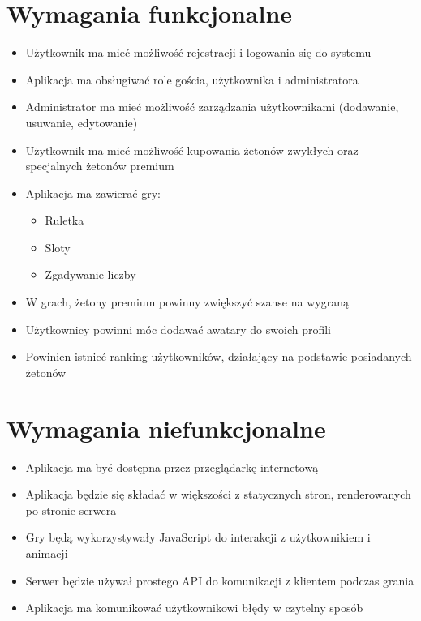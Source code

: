 \newpage

\section{Wymagania funkcjonalne}

\begin{itemize} 
	\item Użytkownik ma mieć możliwość rejestracji i logowania się do systemu
	\item Aplikacja ma obsługiwać role gościa, użytkownika i administratora
	\item Administrator ma mieć możliwość zarządzania użytkownikami (dodawanie, usuwanie, edytowanie)
	\item Użytkownik ma mieć możliwość kupowania żetonów zwykłych oraz specjalnych żetonów premium
	\item Aplikacja ma zawierać gry:
		\begin{itemize}
			\item Ruletka
			\item Sloty
			\item Zgadywanie liczby
		\end{itemize}
	\item W grach, żetony premium powinny zwiększyć szanse na wygraną
	\item Użytkownicy powinni móc dodawać awatary do swoich profili
	\item Powinien istnieć ranking użytkowników, działający na podstawie posiadanych żetonów
\end{itemize}

\section{Wymagania niefunkcjonalne}

\begin{itemize}
	\item Aplikacja ma być dostępna przez przeglądarkę internetową
	\item Aplikacja będzie się składać w większości z statycznych stron, renderowanych po stronie serwera
	\item Gry będą wykorzystywały JavaScript do interakcji z użytkownikiem i animacji 
	\item Serwer będzie używał prostego API do komunikacji z klientem podczas grania
	\item Aplikacja ma komunikować użytkownikowi błędy w czytelny sposób
\end{itemize}
